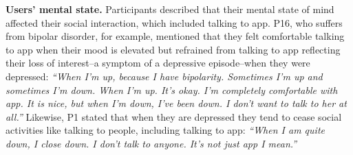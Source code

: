        \textbf{Users' mental state. }
        Participants described that their mental state of mind affected their social interaction, which included talking to \acl{app}.
        P16, who suffers from bipolar disorder, for example, mentioned that they felt comfortable talking to \acl{app} when their mood is elevated but refrained from talking to \acl{app} reflecting their loss of interest--a symptom of a depressive episode--when they were depressed:
                \textit{``When I'm up, because I have bipolarity. Sometimes I'm up and sometimes I'm down. When I'm up. It's okay. I'm completely comfortable with \acl{app}. It is nice, but when I'm down, I've been down. I don't want to talk to her at all.''}
        Likewise, P1 stated that when they are depressed they tend to cease social activities like talking to people, including talking to \acl{app}:
                \textit{``When I am quite down, I close down. I don’t talk to anyone. It’s not just \acl{app} I mean.'' 
                }
